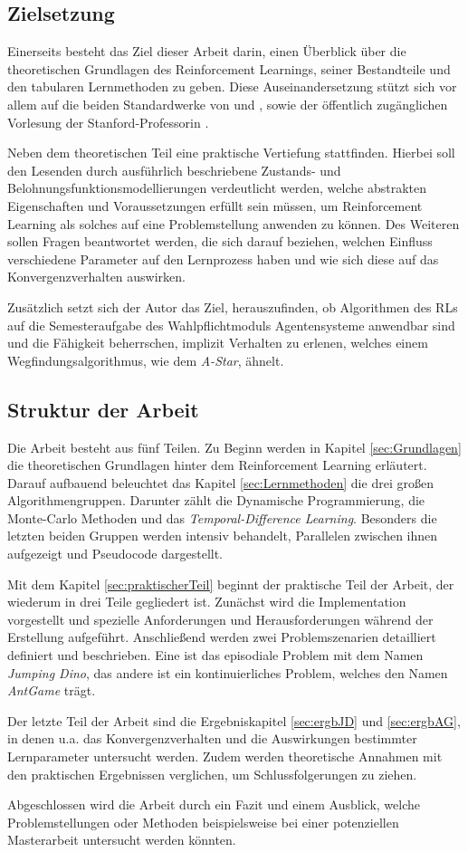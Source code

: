 \subsection{Zielsetzung}
Einerseits besteht das Ziel dieser Arbeit darin, einen Überblick über die theoretischen Grundlagen des Reinforcement Learnings, seiner Bestandteile und den tabularen Lernmethoden zu geben. Diese Auseinandersetzung stützt sich vor allem auf die beiden Standardwerke von \cite{Sutton1998} und \cite{Wiering}, sowie der öffentlich zugänglichen Vorlesung der Stanford-Professorin \cite{Brunskill}.
\par
Neben dem theoretischen Teil eine praktische Vertiefung stattfinden. Hierbei soll den Lesenden durch ausführlich beschriebene Zustands- und Belohnungsfunktionsmodellierungen verdeutlicht werden, welche abstrakten Eigenschaften und Voraussetzungen erfüllt sein müssen, um Reinforcement Learning als solches auf eine Problemstellung anwenden zu können.
Des Weiteren sollen Fragen beantwortet werden, die sich darauf beziehen, welchen Einfluss verschiedene Parameter auf den Lernprozess haben und wie sich diese auf das Konvergenzverhalten auswirken.
\par 
Zusätzlich setzt sich der Autor das Ziel, herauszufinden, ob Algorithmen des RLs auf die Semesteraufgabe des Wahlpflichtmoduls \glqq Agentensysteme\grqq{} anwendbar sind und die Fähigkeit beherrschen, implizit Verhalten zu erlenen, welches einem Wegfindungsalgorithmus, wie dem \textit{A-Star}, ähnelt.

\subsection{Struktur der Arbeit}
Die Arbeit besteht aus fünf Teilen. Zu Beginn werden in Kapitel \ref{sec:Grundlagen} die theoretischen Grundlagen hinter dem Reinforcement Learning erläutert. Darauf aufbauend beleuchtet das Kapitel \ref{sec:Lernmethoden} die drei großen Algorithmengruppen. Darunter zählt die Dynamische Programmierung, die Monte-Carlo Methoden und das \textit{Temporal-Difference Learning}. Besonders die letzten beiden Gruppen werden intensiv behandelt, Parallelen zwischen ihnen aufgezeigt und Pseudocode dargestellt.
\par 
Mit dem Kapitel \ref{sec:praktischerTeil} beginnt der praktische Teil der Arbeit, der wiederum in drei Teile gegliedert ist. Zunächst wird die Implementation vorgestellt und spezielle Anforderungen und Herausforderungen während der Erstellung aufgeführt. Anschließend werden zwei Problemszenarien detailliert definiert und beschrieben. Eine ist das episodiale Problem mit dem Namen \textit{Jumping Dino}, das andere ist ein kontinuierliches Problem, welches den Namen \textit{AntGame} trägt.
\par 
Der letzte Teil der Arbeit sind die Ergebniskapitel \ref{sec:ergbJD} und \ref{sec:ergbAG}, in denen u.a. das Konvergenzverhalten und die Auswirkungen bestimmter Lernparameter untersucht werden. Zudem werden theoretische Annahmen mit den praktischen Ergebnissen verglichen, um Schlussfolgerungen zu ziehen.
\par 
Abgeschlossen wird die Arbeit durch ein Fazit und einem Ausblick, welche Problemstellungen oder Methoden beispielsweise bei einer potenziellen Masterarbeit untersucht werden könnten.